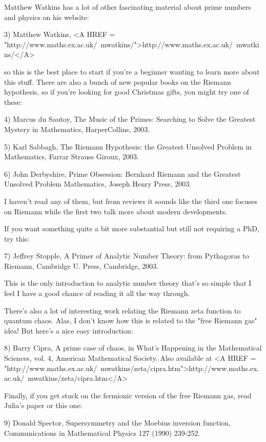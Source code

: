 Matthew Watkins has a lot of other fascinating material about prime numbers
and physics on his website:

3) Matthew Watkins, <A HREF = "http://www.maths.ex.ac.uk/~mwatkins/">http://www.maths.ex.ac.uk/~mwatkins/</A>

so this is the best place to start if you're a beginner wanting to
learn more about this stuff.  There are also a bunch of new popular
books on the Riemann hypothesis, so if you're looking for good
Christmas gifts, you might try one of these:

4) Marcus du Sautoy, The Music of the Primes: Searching to Solve the Greatest
Mystery in Mathematics, HarperCollins, 2003.

5) Karl Sabbagh, The Riemann Hypothesis: the Greatest Unsolved Problem
in Mathematics, Farrar Strauss \text{\&}  Giroux, 2003.

6) John Derbyshire, Prime Obsession: Bernhard Riemann and the Greatest 
Unsolved Problem Mathematics, Joseph Henry Press, 2003.

I haven't read any of them, but from reviews it sounds like the third
one focuses on Riemann while the first two talk more about modern
developments.

If you want something quite a bit more substantial but still not requiring
a PhD, try this:

7) Jeffrey Stopple, A Primer of Analytic Number Theory: from Pythagoras
to Riemann, Cambridge U. Press, Cambridge, 2003.

This is the only introduction to analytic number theory that's so simple that
I feel I have a good chance of reading it all the way through.

There's also a lot of interesting work relating the Riemann zeta
function to quantum chaos.  Alas, I don't know how this is related to
the "free Riemann gas" idea!  But here's a nice easy introduction:

8) Barry Cipra, A prime case of chaos, in What's Happening in the 
Mathematical Sciences, vol. 4, American Mathematical Society.  Also 
available at <A HREF = "http://www.maths.ex.ac.uk/~mwatkins/zeta/cipra.htm">http://www.maths.ex.ac.uk/~mwatkins/zeta/cipra.htm</A>

Finally, if you get stuck on the fermionic version of the free Riemann
gas, read Julia's paper or this one:

9) Donald Spector, Supersymmetry and the Moebius inversion function,
Communications in Mathematical Physics 127 (1990) 239-252.


